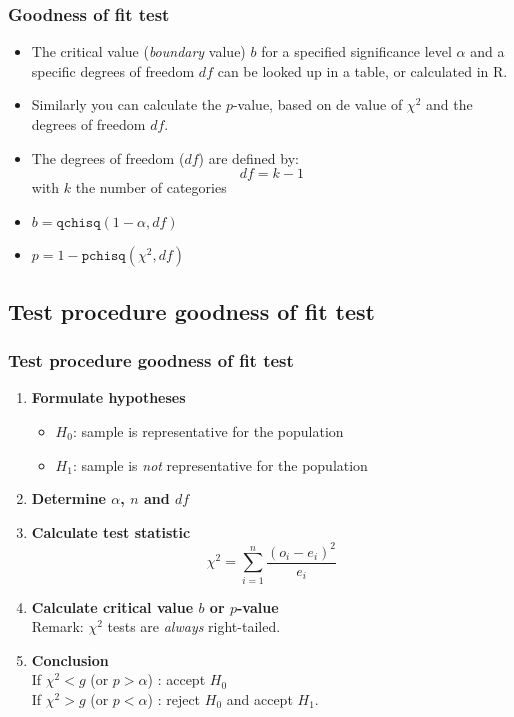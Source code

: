 \documentclass{beamer}
\begin{document}
\begin{frame}
\frametitle{Goodness of fit test}

\begin{itemize}
    \item The critical value (\textit{boundary} value) $b$ for a specified significance level $\alpha$ and a specific degrees of freedom $df$ can be looked up in a table, or calculated in R.
\vfill
    \item Similarly you can calculate the $p$-value, based on de value of $\chi^2$ and the degrees of freedom $df$.
\vfill
    \item The degrees of freedom ($df$) are defined by:
    \[ df = k -1 \]
    with $k$ the number of categories
\vfill 
    \item $b = \texttt{qchisq}(1-\alpha,df)$
    \item $p = 1-\texttt{pchisq}(\chi^2,df)$
\end{itemize}
\end{frame}

\subsection{Test procedure goodness of fit test}

\begin{frame}
  \frametitle{Test procedure goodness of fit test}
  \begin{enumerate}
  \item \textbf{Formulate hypotheses}
    \begin{itemize}
      \item $H_{0}$: sample is representative for the population
      \item $H_{1}$: sample is \emph{not} representative for the population
    \end{itemize}
  \item \textbf{Determine $\alpha$, $n$ and $df$}
  \item \textbf{Calculate test statistic}
  \[ \chi^{2} = \sum_{i=1}^{n} \frac{(o_{i} - e_{i})^{2}}{e_{i}} \]
  \item \textbf{Calculate critical value $b$ or $p$-value}\\
  Remark: $\chi^2$ tests are \emph{always} right-tailed.
  \item \textbf{Conclusion}\\
   If $\chi^2 < g$ (or $p > \alpha$) : accept $H_{0}$\\
   If $\chi^2 > g$ (or $p < \alpha$) : reject $H_{0}$ and accept $H_{1}$.
\end{enumerate}
\end{frame}
\end{document}
